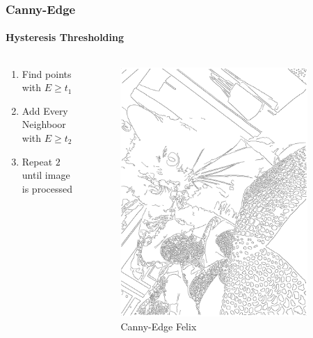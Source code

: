 \begin{frame}
	\frametitle{Canny-Edge}
	\framesubtitle{Hysteresis Thresholding}
	\begin{columns}
		\begin{column}{0.6\textwidth}
			\begin{enumerate}
				\item Find points with $E \geq t_1$
				\item Add Every Neighboor with $E \geq t_2$
				\item Repeat $2$ until image is processed 
			\end{enumerate}
		\end{column}
		\begin{column}{0.4\textwidth}
			\begin{figure}
				\centering
				\includegraphics[width=0.9\textwidth]{images/KadseCanny}
				\caption[Canny-Edge Felix\footnote{Took ~30 seconds for Felix}]{Canny-Edge Felix}
				\label{fig:kadsecanny}
			\end{figure}	
		\end{column}
	\end{columns}
\end{frame}
